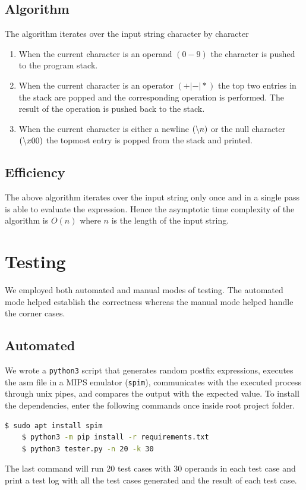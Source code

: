 \documentclass[hidelinks,12pt]{article}
\begin{document}
\subsection{Algorithm}
The algorithm iterates over the input string character by character
\begin{enumerate}
    \item When the current character is an operand $(0-9)$ the character is pushed to the program stack.
    \item When the current character is an operator $(+|-|*)$ the top two entries in the stack are popped and the corresponding operation is performed. The result of the operation is pushed back to the stack.
    \item When the current character is either a newline $(\symbol{92}n)$ or the null character $(\symbol{92}x00)$ the topmost entry is popped from the stack and printed.
\end{enumerate}

\subsection{Efficiency}
The above algorithm iterates over the input string only once and in a single pass is able to evaluate the expression.
Hence the asymptotic time complexity of the algorithm is $O(n)$ where $n$ is the length of the input string.


\section{Testing}
We employed both automated and manual modes of testing. The automated mode helped establish the correctness whereas the manual mode helped handle the corner cases.
\subsection{Automated}
We wrote a \verb|python3| script that generates random postfix expressions, executes the asm file in a MIPS emulator (\verb|spim|), communicates with the executed process through unix pipes, and compares the
output with the expected value. To install the dependencies, enter the following commands once inside root project folder.
\begin{lstlisting}[language=bash]
    $ sudo apt install spim
    $ python3 -m pip install -r requirements.txt
    $ python3 tester.py -n 20 -k 30 
\end{lstlisting}
The last command will run $20$ test cases with $30$ operands in each test case and print a test log with all the test cases generated and the result of each test case.
\end{document}
